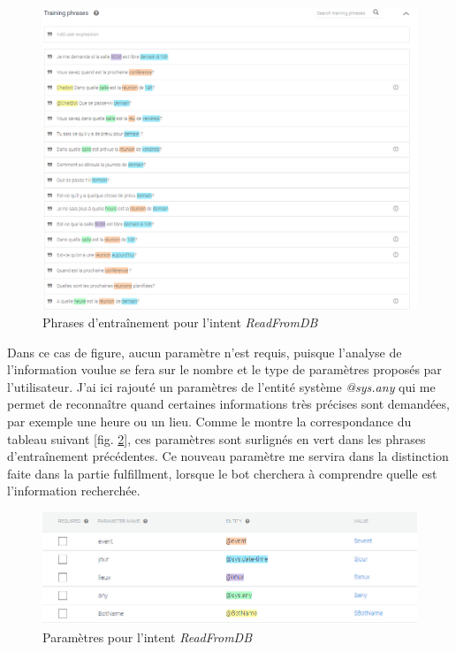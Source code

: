 \documentclass[stage2a]{tnreport} %
\begin{document}
\begin{figure}[h!]
    \centering
    \includegraphics[width=\textwidth]{figures/RFDBtraining.png}
    \caption{Phrases d'entraînement pour l'intent \emph{ReadFromDB}}
    \label{RFDBtrain}
\end{figure}

Dans ce cas de figure, aucun paramètre n'est requis, puisque l'analyse de l'information voulue se fera sur le nombre et le type de paramètres proposés par l'utilisateur. J'ai ici rajouté un paramètres de l'entité système \emph{@sys.any} qui me permet de reconnaître quand certaines informations très précises sont demandées, par exemple une heure ou un lieu. Comme le montre la correspondance du tableau suivant [fig. \ref{RFDBparam}], ces paramètres sont surlignés en vert dans les phrases d'entraînement précédentes. Ce nouveau paramètre me servira dans la distinction faite dans la partie fulfillment, lorsque le bot cherchera à comprendre quelle est l'information recherchée.\\

\begin{figure}[h!]
    \centering
    \includegraphics[width=\textwidth]{figures/RFDBparam.PNG}
    \caption{Paramètres pour l'intent \emph{ReadFromDB}}
    \label{RFDBparam}
\end{figure}
\end{document}
